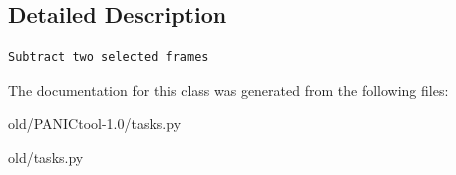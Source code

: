 \subsection{Detailed Description}


\footnotesize\begin{verbatim}Subtract two selected frames
\end{verbatim}
\normalsize
 



The documentation for this class was generated from the following files:\begin{CompactItemize}
\item 
old/PANICtool-1.0/tasks.py\item 
old/tasks.py\end{CompactItemize}
